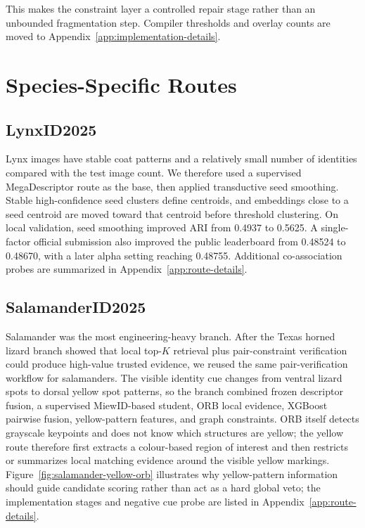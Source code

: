\documentclass{ceurart}
\begin{document}
This makes the constraint layer a controlled repair stage rather than an unbounded fragmentation step. Compiler thresholds and overlay counts are moved to Appendix~\ref{app:implementation-details}.

\section{Species-Specific Routes}
\subsection{LynxID2025}
Lynx images have stable coat patterns and a relatively small number of identities compared with the test image count. We therefore used a supervised MegaDescriptor route as the base, then applied transductive seed smoothing. Stable high-confidence seed clusters define centroids, and embeddings close to a seed centroid are moved toward that centroid before threshold clustering. On local validation, seed smoothing improved ARI from 0.4937 to 0.5625. A single-factor official submission also improved the public leaderboard from 0.48524 to 0.48670, with a later alpha setting reaching 0.48755.
Additional co-association probes are summarized in Appendix~\ref{app:route-details}.

\subsection{SalamanderID2025}
Salamander was the most engineering-heavy branch. After the Texas horned lizard branch showed that local top-$K$ retrieval plus pair-constraint verification could produce high-value trusted evidence, we reused the same pair-verification workflow for salamanders. The visible identity cue changes from ventral lizard spots to dorsal yellow spot patterns, so the branch combined frozen descriptor fusion, a supervised MiewID-based student, ORB local evidence, XGBoost pairwise fusion, yellow-pattern features, and graph constraints. ORB itself detects grayscale keypoints and does not know which structures are yellow; the yellow route therefore first extracts a colour-based region of interest and then restricts or summarizes local matching evidence around the visible yellow markings. Figure~\ref{fig:salamander-yellow-orb} illustrates why yellow-pattern information should guide candidate scoring rather than act as a hard global veto; the implementation stages and negative cue probe are listed in Appendix~\ref{app:route-details}.
\end{document}
